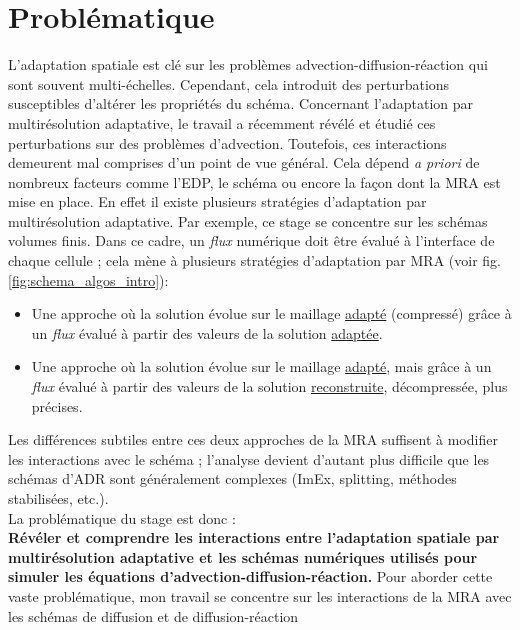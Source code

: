     \section{Problématique}
    \label{par:problematique}
        L'adaptation spatiale est clé sur les problèmes advection-diffusion-réaction qui sont souvent multi-échelles.
        Cependant, cela introduit des perturbations susceptibles d'altérer les propriétés du schéma.
        Concernant l'adaptation par multirésolution adaptative, le travail \cite{belloti_et_al_2025,Massot2025_meshAdaptation} a récemment révélé et étudié 
        ces perturbations sur des problèmes d'advection. 
        Toutefois, ces interactions demeurent mal comprises d'un point de vue général.
        Cela dépend \emph{a priori} de nombreux facteurs comme l'EDP, le schéma ou encore la façon dont la MRA est mise en place. 
        En effet il existe plusieurs stratégies d'adaptation par multirésolution adaptative. Par exemple, ce stage se concentre sur les schémas volumes finis.
        Dans ce cadre, un \emph{flux} numérique doit être évalué à l'interface de chaque cellule ; cela mène à plusieurs stratégies d'adaptation par MRA (voir fig. \ref{fig:schema_algos_intro}): 
        \begin{itemize}
            \item Une approche  où la solution évolue sur le maillage \underline{adapté} (compressé) grâce à un \emph{flux} évalué à partir des valeurs de la solution \underline{adaptée}.
            \item Une approche  où la solution évolue sur le maillage \underline{adapté}, mais grâce à un \emph{flux} évalué à partir des valeurs de la solution \underline{reconstruite}, décompressée, plus précises.
        \end{itemize}
        Les différences subtiles entre ces deux approches de la MRA suffisent à modifier les interactions avec le schéma ;
        l'analyse devient d'autant plus difficile que les schémas d'ADR sont généralement complexes (ImEx, splitting, méthodes stabilisées, etc.).\\
    La problématique du stage est donc : \\\textbf{Révéler et comprendre les interactions entre l'adaptation spatiale par multirésolution adaptative et les schémas numériques 
    utilisés pour simuler les équations d'advection-diffusion-réaction.}
    Pour aborder cette vaste problématique, mon travail se concentre sur les interactions de la MRA avec les schémas de diffusion et de diffusion-réaction
